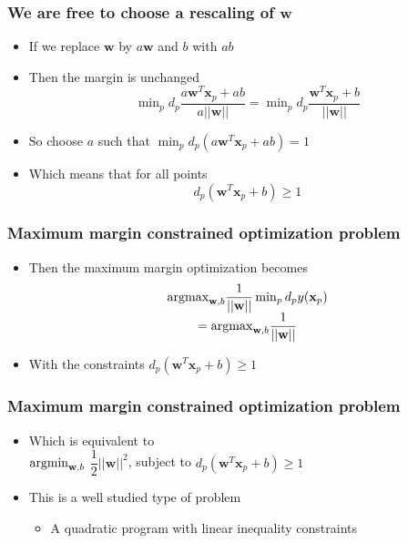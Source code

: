 \documentclass[12pt,notes,mathserif]{beamer}
\begin{document}
\begin{frame}[c]
	\frametitle{We are free to choose a rescaling of $\mathbf{w}$}
	\begin{itemize}
		\item If we replace $\mathbf{w}$ by $a\mathbf{w}$ and $b$ with $ab$
		\item Then the margin is unchanged
		      \[
			      \min\nolimits_pd_p\dfrac{a\mathbf{w}^T\mathbf{x}_p+ab}{a||\mathbf{w}||}=
			      \min\nolimits_pd_p
			      \dfrac{\mathbf{w}^T\mathbf{x}_p+b}{||\mathbf{w}||}
		      \]
		\item So choose $a$ such that $\min_pd_p(a\mathbf{w}^T\mathbf{x}_p+ab)=1$
		\item Which means that for all points
		      \[
			      d_p(\mathbf{w}^T\mathbf{x}_p+b)\geqslant{}1
		      \]
	\end{itemize}
\end{frame}


\begin{frame}[c]
	\frametitle{Maximum margin constrained optimization problem}
	\begin{itemize}
		\item Then the maximum margin optimization becomes
		      \[
			      \begin{array}{c}
				      {\mathop{\mathrm{argmax}}}_{\mathbf{w},b}\dfrac{1}{||\mathbf{w}||} \min_pd_py(\mathbf{x}_p) \\
				      = {\mathop{\mathrm{argmax}}}_{\mathbf{w},b}\dfrac{1}{||\mathbf{w}||}
			      \end{array}
		      \]
		\item With the constraints $d_p(\mathbf{w}^T\mathbf{x}_p+b)\geqslant{}1$
	\end{itemize}
\end{frame}

\begin{frame}[c]
	\frametitle{Maximum margin constrained optimization problem}
	\begin{itemize}
		\item Which is equivalent to \\
		      $\mathop{\mathrm{argmin}}_{\mathbf{w},b}$ $\dfrac{1}{2}||\mathbf{w}||^2$, subject to $d_p(\mathbf{w}^T\mathbf{x}_p+b)\geqslant{}1$
		\item This is a well studied type of problem
		      \begin{itemize}
			      \item A quadratic program with linear inequality constraints
		      \end{itemize}
	\end{itemize}
\end{frame}
\end{document}
